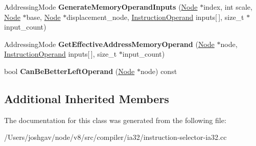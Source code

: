 \begin{DoxyCompactItemize}
\item 
Addressing\+Mode {\bfseries Generate\+Memory\+Operand\+Inputs} (\hyperlink{classv8_1_1internal_1_1compiler_1_1_node}{Node} $\ast$index, int scale, \hyperlink{classv8_1_1internal_1_1compiler_1_1_node}{Node} $\ast$base, \hyperlink{classv8_1_1internal_1_1compiler_1_1_node}{Node} $\ast$displacement\+\_\+node, \hyperlink{classv8_1_1internal_1_1compiler_1_1_instruction_operand}{Instruction\+Operand} inputs\mbox{[}$\,$\mbox{]}, size\+\_\+t $\ast$input\+\_\+count)\hypertarget{classv8_1_1internal_1_1compiler_1_1_i_a32_operand_generator_a09d67ff6f35c523810fef3761bcad80b}{}\label{classv8_1_1internal_1_1compiler_1_1_i_a32_operand_generator_a09d67ff6f35c523810fef3761bcad80b}

\item 
Addressing\+Mode {\bfseries Get\+Effective\+Address\+Memory\+Operand} (\hyperlink{classv8_1_1internal_1_1compiler_1_1_node}{Node} $\ast$node, \hyperlink{classv8_1_1internal_1_1compiler_1_1_instruction_operand}{Instruction\+Operand} inputs\mbox{[}$\,$\mbox{]}, size\+\_\+t $\ast$input\+\_\+count)\hypertarget{classv8_1_1internal_1_1compiler_1_1_i_a32_operand_generator_acb802f165f767140608caabf0f007576}{}\label{classv8_1_1internal_1_1compiler_1_1_i_a32_operand_generator_acb802f165f767140608caabf0f007576}

\item 
bool {\bfseries Can\+Be\+Better\+Left\+Operand} (\hyperlink{classv8_1_1internal_1_1compiler_1_1_node}{Node} $\ast$node) const \hypertarget{classv8_1_1internal_1_1compiler_1_1_i_a32_operand_generator_a407f8a45758bd36d3fca9178b881ab34}{}\label{classv8_1_1internal_1_1compiler_1_1_i_a32_operand_generator_a407f8a45758bd36d3fca9178b881ab34}

\end{DoxyCompactItemize}
\subsection*{Additional Inherited Members}


The documentation for this class was generated from the following file\+:\begin{DoxyCompactItemize}
\item 
/\+Users/joshgav/node/v8/src/compiler/ia32/instruction-\/selector-\/ia32.\+cc\end{DoxyCompactItemize}
